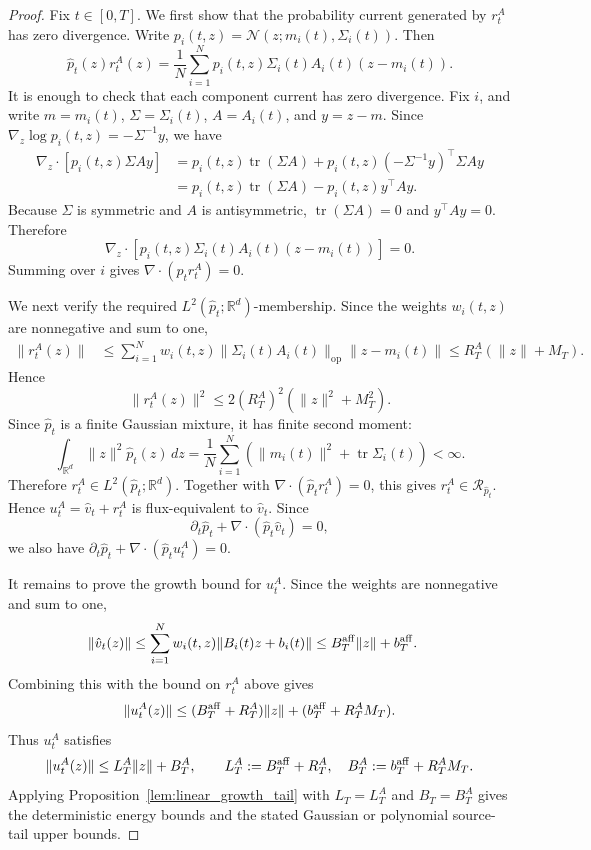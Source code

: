 \documentclass[a4paper,11pt]{article}
\theoremstyle{plain}
\theoremstyle{definition}
\begin{document}
\begin{proof}
Fix \(t\in[0,T]\). We first show that the probability current generated by
\(r_t^A\) has zero divergence. Write
\(p_i(t,z)=\mathcal N(z;m_i(t),\Sigma_i(t))\). Then
\[
    \hat p_t(z)r_t^A(z)
    =
    \frac1N
    \sum_{i=1}^N
    p_i(t,z)\Sigma_i(t)A_i(t)(z-m_i(t)).
\]
It is enough to check that each component current has zero divergence. Fix
\(i\), and write \(m=m_i(t)\), \(\Sigma=\Sigma_i(t)\), \(A=A_i(t)\), and
\(y=z-m\). Since \(\nabla_z\log p_i(t,z)=-\Sigma^{-1}y\), we have
\[
\begin{aligned}
    \nabla_z\cdot\left[p_i(t,z)\Sigma A y\right]
    &=
    p_i(t,z)\operatorname{tr}(\Sigma A)
    +
    p_i(t,z)(-\Sigma^{-1}y)^\top\Sigma A y \\
    &=
    p_i(t,z)\operatorname{tr}(\Sigma A)
    -
    p_i(t,z)y^\top A y.
\end{aligned}
\]
Because \(\Sigma\) is symmetric and \(A\) is antisymmetric,
\(\operatorname{tr}(\Sigma A)=0\) and \(y^\top A y=0\). Therefore
\[
    \nabla_z\cdot
    \left[
        p_i(t,z)\Sigma_i(t)A_i(t)(z-m_i(t))
    \right]
    =
    0.
\]
Summing over \(i\) gives
\(
    \nabla\cdot(\hat p_t r_t^A)=0.
\)

We next verify the required \(L^2(\hat p_t;\mathbb R^d)\)-membership. Since
the weights \(w_i(t,z)\) are nonnegative and sum to one,
\[
\begin{aligned}
    \|r_t^A(z)\|
    &\le
    \sum_{i=1}^N
    w_i(t,z)\|\Sigma_i(t)A_i(t)\|_{\mathrm{op}}\|z-m_i(t)\| \le
    R_T^A(\|z\|+M_T).
\end{aligned}
\]
Hence
\[
    \|r_t^A(z)\|^2
    \le
    2(R_T^A)^2(\|z\|^2+M_T^2).
\]
Since \(\hat p_t\) is a finite Gaussian mixture, it has finite second moment:
\[
    \int_{\mathbb R^d}\|z\|^2\hat p_t(z)\,dz
    =
    \frac1N\sum_{i=1}^N
    \left(\|m_i(t)\|^2+\operatorname{tr}\Sigma_i(t)\right)
    <\infty.
\]
Therefore \(r_t^A\in L^2(\hat p_t;\mathbb R^d)\). Together with
\(\nabla\cdot(\hat p_t r_t^A)=0\), this gives
\(r_t^A\in\mathcal R_{\hat p_t}\). Hence \(u_t^A=\hat v_t+r_t^A\) is
flux-equivalent to \(\hat v_t\). Since
\[
    \partial_t\hat p_t+\nabla\cdot(\hat p_t\hat v_t)=0,
\]
we also have
\(
    \partial_t\hat p_t+\nabla\cdot(\hat p_tu_t^A)=0.
\)

It remains to prove the growth bound for \(u_t^A\). Since the weights are
nonnegative and sum to one,
\[
\begin{aligned}
    \|\hat v_t(z)\|
    &\le
    \sum_{i=1}^N w_i(t,z)\|B_i(t)z+b_i(t)\| \le
    B_T^{\rm aff}\|z\|+b_T^{\rm aff}.
\end{aligned}
\]
Combining this with the bound on \(r_t^A\) above gives
\[
    \|u_t^A(z)\|
    \le
    (B_T^{\rm aff}+R_T^A)\|z\|
    +
    (b_T^{\rm aff}+R_T^A M_T).
\]
Thus \(u_t^A\) satisfies
\[
    \|u_t^A(z)\|
    \le
    L_T^A\|z\|+B_T^A,
    \qquad
    L_T^A:=B_T^{\rm aff}+R_T^A,
    \quad
    B_T^A:=b_T^{\rm aff}+R_T^A M_T.
\]
Applying Proposition~\ref{lem:linear_growth_tail} with \(L_T=L_T^A\) and
\(B_T=B_T^A\) gives the deterministic energy bounds and the stated Gaussian
or polynomial source-tail upper bounds.
\end{proof}
\end{document}
